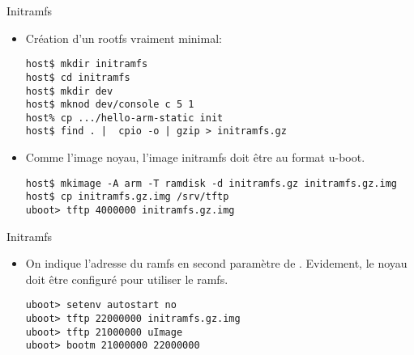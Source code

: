 \begin{frame}[fragile=singleslide]{Initramfs}
  \begin{itemize} 
  \item Création d'un rootfs vraiment minimal:
    \begin{lstlisting}
host$ mkdir initramfs
host$ cd initramfs
host$ mkdir dev
host$ mknod dev/console c 5 1
host% cp .../hello-arm-static init
host$ find . |  cpio -o | gzip > initramfs.gz
    \end{lstlisting}
  \item Comme l'image noyau, l'image initramfs doit être au format u-boot.
    \begin{lstlisting} 
host$ mkimage -A arm -T ramdisk -d initramfs.gz initramfs.gz.img
host$ cp initramfs.gz.img /srv/tftp
uboot> tftp 4000000 initramfs.gz.img
    \end{lstlisting}
  \end{itemize}
\end{frame}

\begin{frame}[fragile=singleslide]{Initramfs}
  \begin{itemize} 
  \item  On  indique  l'adresse   du  ramfs  en  second  paramètre  de
    . Evidement, le noyau doit être configuré pour utiliser
    le ramfs.
    \begin{lstlisting} 
uboot> setenv autostart no
uboot> tftp 22000000 initramfs.gz.img 
uboot> tftp 21000000 uImage 
uboot> bootm 21000000 22000000 
    \end{lstlisting}
  \end{itemize}
\end{frame}


